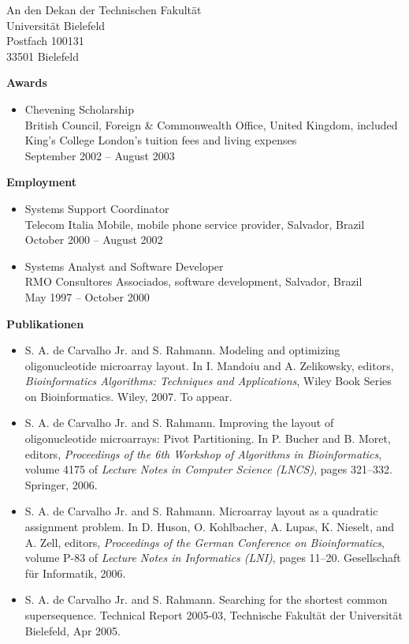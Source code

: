 \documentclass[a4paper,11pt]{letter}
\begin{document}
\begin{letter}{
  An den Dekan der Technischen Fakult\"at\\
  Universit\"at Bielefeld\\
  Postfach 100131\\
  33501 Bielefeld
}
\begin{itemize}
\end{itemize}

{\bf Awards}
\begin{itemize}

\item Chevening Scholarship\\
      British Council, Foreign \& Commonwealth Office, United Kingdom, included
      King's College London's tuition fees and living expenses\\
      September 2002 -- August 2003

\end{itemize}

{\bf Employment}
\begin{itemize}

\item Systems Support Coordinator\\
      Telecom Italia Mobile, mobile phone service provider, Salvador, Brazil\\
      October 2000 -- August 2002

\item Systems Analyst and Software Developer\\
      RMO Consultores Associados, software development, Salvador, Brazil\\
      May 1997 -- October 2000

\end{itemize}

\newpage
{\bf\large Publikationen}

\begin{itemize}
\item S. A. de Carvalho Jr. and S. Rahmann. Modeling and optimizing
oligonucleotide microarray layout. In I. Mandoiu and A. Zelikowsky, editors,
\emph{Bioinformatics Algorithms: Techniques and Applications}, Wiley Book Series
on Bioinformatics. Wiley, 2007. To appear.

\item S. A. de Carvalho Jr. and S. Rahmann. Improving the layout of
oligonucleotide microarrays: Pivot Partitioning. In P. Bucher and B. Moret,
editors, \emph{Proceedings of the 6th Workshop of Algorithms in Bioinformatics},
volume 4175 of \emph{Lecture Notes in Computer Science (LNCS)}, pages 321--332.
Springer, 2006.

\item S. A. de Carvalho Jr. and S. Rahmann. Microarray layout as a quadratic
assignment problem. In D. Huson, O. Kohlbacher, A. Lupas, K. Nieselt, and A.
Zell, editors, \emph{Proceedings of the German Conference on Bioinformatics},
volume P-83 of \emph{Lecture Notes in Informatics (LNI)}, pages 11--20.
Gesellschaft f\"ur Informatik, 2006.

\item S. A. de Carvalho Jr. and S. Rahmann. Searching for the shortest common
supersequence. Technical Report 2005-03, Technische Fakult\"at der Universit\"at
Bielefeld, Apr 2005.
\end{itemize}

\end{letter}
\end{document}
